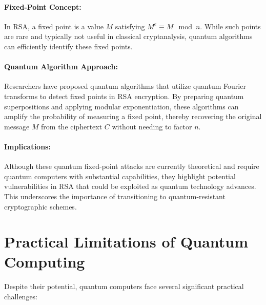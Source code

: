 \documentclass{article}
\begin{document}
\paragraph{Fixed-Point Concept:} In RSA, a fixed point is a value \( M \) satisfying \( M^e \equiv M \mod n \). While such points are rare and typically not useful in classical cryptanalysis, quantum algorithms can efficiently identify these fixed points.

\paragraph{Quantum Algorithm Approach:} Researchers have proposed quantum algorithms that utilize quantum Fourier transforms to detect fixed points in RSA encryption. By preparing quantum superpositions and applying modular exponentiation, these algorithms can amplify the probability of measuring a fixed point, thereby recovering the original message \( M \) from the ciphertext \( C \) without needing to factor \( n \).

\paragraph{Implications:} Although these quantum fixed-point attacks are currently theoretical and require quantum computers with substantial capabilities, they highlight potential vulnerabilities in RSA that could be exploited as quantum technology advances. This underscores the importance of transitioning to quantum-resistant cryptographic schemes.


\section{Practical Limitations of Quantum Computing}
Despite their potential, quantum computers face several significant practical challenges:
\end{document}
